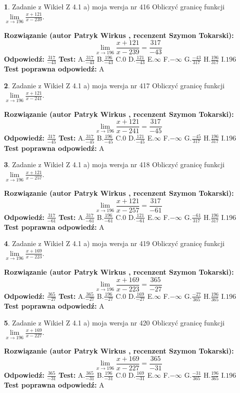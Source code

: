 \documentclass[12pt, a4paper]{article}
\theoremstyle{definition} %
\newtheorem{zad}{}
\newcommand{\zadStart}[1]{\begin{zad}#1\newline}
\newcommand{\zadStop}{\end{zad}}
\newcommand{\rozwStart}[2]{\noindent \textbf{Rozwiązanie (autor #1 , recenzent #2): }\newline}
\newcommand{\rozwStop}{\newline}
\newcommand{\odpStart}{\noindent \textbf{Odpowiedź:}\newline}
\newcommand{\odpStop}{\newline}
\newcommand{\testStart}{\noindent \textbf{Test:}\newline}
\newcommand{\testStop}{\newline}
\newcommand{\kluczStart}{\noindent \textbf{Test poprawna odpowiedź:}\newline}
\newcommand{\kluczStop}{\newline}
\begin{document}
\zadStart{Zadanie z Wikieł Z 4.1 a) moja wersja nr 416}
Obliczyć granicę funkcji $\lim\limits_{x\to196}\frac{x+121}{x-239}$.
\zadStop
\rozwStart{Patryk Wirkus}{Szymon Tokarski}
$$\lim\limits_{x\to196}\frac{x+121}{x-239} = \frac{317}{-43}$$
\rozwStop
\odpStart
$\frac{317}{-43}$
\odpStop
\testStart
A.$\frac{317}{-43}$
B.$\frac{196}{-43}$
C.$0$
D.$\frac{121}{-43}$
E.$\infty$
F.$-\infty$
G.$\frac{-43}{317}$
H.$\frac{196}{317}$
I.$196$
\testStop
\kluczStart
A
\kluczStop



\zadStart{Zadanie z Wikieł Z 4.1 a) moja wersja nr 417}
Obliczyć granicę funkcji $\lim\limits_{x\to196}\frac{x+121}{x-241}$.
\zadStop
\rozwStart{Patryk Wirkus}{Szymon Tokarski}
$$\lim\limits_{x\to196}\frac{x+121}{x-241} = \frac{317}{-45}$$
\rozwStop
\odpStart
$\frac{317}{-45}$
\odpStop
\testStart
A.$\frac{317}{-45}$
B.$\frac{196}{-45}$
C.$0$
D.$\frac{121}{-45}$
E.$\infty$
F.$-\infty$
G.$\frac{-45}{317}$
H.$\frac{196}{317}$
I.$196$
\testStop
\kluczStart
A
\kluczStop



\zadStart{Zadanie z Wikieł Z 4.1 a) moja wersja nr 418}
Obliczyć granicę funkcji $\lim\limits_{x\to196}\frac{x+121}{x-257}$.
\zadStop
\rozwStart{Patryk Wirkus}{Szymon Tokarski}
$$\lim\limits_{x\to196}\frac{x+121}{x-257} = \frac{317}{-61}$$
\rozwStop
\odpStart
$\frac{317}{-61}$
\odpStop
\testStart
A.$\frac{317}{-61}$
B.$\frac{196}{-61}$
C.$0$
D.$\frac{121}{-61}$
E.$\infty$
F.$-\infty$
G.$\frac{-61}{317}$
H.$\frac{196}{317}$
I.$196$
\testStop
\kluczStart
A
\kluczStop



\zadStart{Zadanie z Wikieł Z 4.1 a) moja wersja nr 419}
Obliczyć granicę funkcji $\lim\limits_{x\to196}\frac{x+169}{x-223}$.
\zadStop
\rozwStart{Patryk Wirkus}{Szymon Tokarski}
$$\lim\limits_{x\to196}\frac{x+169}{x-223} = \frac{365}{-27}$$
\rozwStop
\odpStart
$\frac{365}{-27}$
\odpStop
\testStart
A.$\frac{365}{-27}$
B.$\frac{196}{-27}$
C.$0$
D.$\frac{169}{-27}$
E.$\infty$
F.$-\infty$
G.$\frac{-27}{365}$
H.$\frac{196}{365}$
I.$196$
\testStop
\kluczStart
A
\kluczStop



\zadStart{Zadanie z Wikieł Z 4.1 a) moja wersja nr 420}
Obliczyć granicę funkcji $\lim\limits_{x\to196}\frac{x+169}{x-227}$.
\zadStop
\rozwStart{Patryk Wirkus}{Szymon Tokarski}
$$\lim\limits_{x\to196}\frac{x+169}{x-227} = \frac{365}{-31}$$
\rozwStop
\odpStart
$\frac{365}{-31}$
\odpStop
\testStart
A.$\frac{365}{-31}$
B.$\frac{196}{-31}$
C.$0$
D.$\frac{169}{-31}$
E.$\infty$
F.$-\infty$
G.$\frac{-31}{365}$
H.$\frac{196}{365}$
I.$196$
\testStop
\kluczStart
A
\kluczStop
\end{document}
